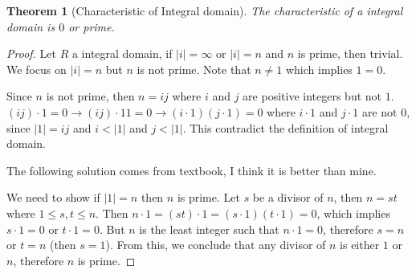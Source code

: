 \documentclass[14pt]{extarticle}
\newtheorem{theorem}{Theorem}[section]
\newcommand{\1}{\{e\}}
\begin{document}
\begin{theorem}[Characteristic of Integral domain]
  The characteristic of a integral domain is $0$ or prime.
\end{theorem}
\begin{proof}
  Let $R$ a integral domain, if $|i| = \infty$ or $|i| = n$ and $n$ is prime, then trivial.
  We focus on $|i| = n$ but $n$ is not prime.
  Note that $n \neq 1$ which implies $1 = 0$.

  Since $n$ is not prime, then $n = ij$ where $i$ and $j$ are positive integers but not $1$.
  $(ij) \cdot 1 = 0 \rightarrow (ij) \cdot 1 1 = 0 \rightarrow (i \cdot 1) (j \cdot 1) = 0$
  where $i \cdot 1$ and $j \cdot 1$ are not $0$, since $|1| = ij$ and $i < |1|$ and $j < |1|$.
  This contradict the definition of integral domain.

  The following solution comes from textbook, I think it is better than mine.\par
  We need to show if $|1| = n$ then $n$ is prime. Let $s$ be a divisor of $n$,
  then $n = st$ where $1 \leq s , t \leq n$.
  Then $n \cdot 1 = (st) \cdot 1 = (s \cdot 1)(t \cdot 1) = 0$, which
  implies $s \cdot 1 = 0$ or $t \cdot 1 = 0$. 
  But $n$ is the least integer such that $n \cdot 1 = 0$,
  therefore $s = n$ or $t = n$ (then $s = 1$).
  From this, we conclude that any divisor of $n$ is either $1$ or $n$, 
  therefore $n$ is prime.
\end{proof}
\end{document}
